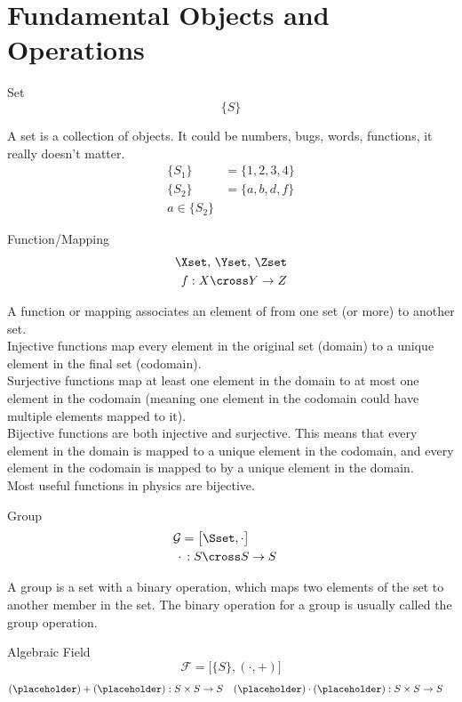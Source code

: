 \section{Fundamental Objects and Operations}
	\begin{mathbox}{Set}
		\begin{equation*}
			\{S\}
		\end{equation*}
	\end{mathbox}
	A set is a collection of objects. It could be numbers, bugs, words, functions, it really doesn't matter.
	\begin{align*}
		\{S_1\} &= \{1,2,3,4\}
		\\
		\{S_2\} &= \{a,b,d,f\}
		\\
		a\in\{S_2\}
	\end{align*}

	\begin{mathbox}{Function/Mapping}
		\begin{align*}
			\Xset,\,\Yset,\,\Zset
			\\
			f: X\cross Y\rightarrow Z
		\end{align*}
	\end{mathbox}
	A function or mapping associates an element of from one set (or more) to another set.  
	\\
	Injective functions map every element in the original set (domain) to a unique element in the final set (codomain).
	\\
	Surjective functions map at least one element in the domain to at most one element in the codomain (meaning one element in the codomain could have multiple elements mapped to it). 
	\\
	Bijective functions are both injective and surjective. This means that every element in the domain is mapped to a unique element in the codomain, and every element in the codomain is mapped to by a unique element in the domain.
	\\
	Most useful functions in physics are bijective.
	\newpage
	\begin{mathbox}{Group}
		\begin{align*}
			\mathcal{G}=\big[\Sset,\cdot\big]
			\\
			{\bf\cdot}\,:S\cross S&\rightarrow S
		\end{align*}
	\end{mathbox}
	A group is a set with a binary operation, which maps two elements of the set to another member in the set. The binary operation for a group is usually called the group operation. 
	\begin{mathbox}{Algebraic Field}
		\begin{equation*}
			\mathcal{F}=\big[\{S\},(\cdot,+)\big]
		\end{equation*}
		\begin{align*}
			(\placeholder)+(\placeholder):S\times S&\rightarrow S
			&
			(\placeholder)\cdot(\placeholder):S\times S&\rightarrow S
		\end{align*}
	\end{mathbox}
